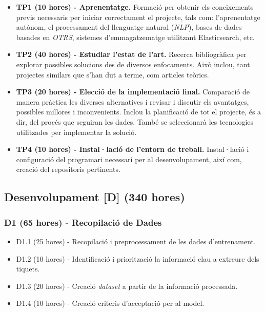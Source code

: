 \begin{itemize}
    \item \textbf{TP1 (10 hores) - Aprenentatge.}
        Formació per obtenir els coneixements previs necessaris per iniciar correctament el projecte, tals com: l'aprenentatge autònom, el processament del llenguatge natural (\textit{NLP}), bases de dades basades en \textit{OTRS}, sistemes d'emmagatzematge utilitzant Elasticsearch, etc.
    
    \item \textbf{TP2 (40 hores) - Estudiar l'estat de l'art.}
        Recerca bibliogràfica per explorar possibles solucions des de diversos enfocaments. Això inclou, tant projectes similars que s'han dut a terme, com articles teòrics.
    
    \item \textbf{TP3 (20 hores) - Elecció de la implementació final.}
        Comparació de manera pràctica les diverses alternatives i revisar i discutir els avantatges, possibles millores i inconvenients. Inclou la planificació de tot el projecte, és a dir, del procés que seguiran les dades. També se seleccionarà les tecnologies utilitzades per implementar la solució.
        
    \item \textbf{TP4 (10 hores) - Instal·lació de l'entorn de treball.}
        Instal·lació i configuració del programari necessari per al desenvolupament, així com, creació del repositoris pertinents.
\end{itemize}


\subsection{Desenvolupament [D] (340 hores)}

\subsubsection{D1 (65 hores) - Recopilació de Dades}
\begin{itemize}
    \item D1.1 (25 hores) - Recopilació i preprocessament de les dades d'entrenament.
    \item D1.2 (10 hores) - Identificació i priorització la informació clau a extreure dels tiquets.
    \item D1.3 (20 hores) - Creació \textit{dataset} a partir de la informació processada.
    \item D1.4 (10 hores) - Creació criteris d'acceptació per al model.
\end{itemize}

